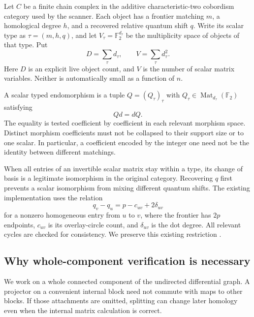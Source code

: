 \documentclass[11pt,a4paper]{article}
\theoremstyle{definition}\newtheorem{definition}[theorem]{Definition}
\theoremstyle{remark}\newtheorem{remark}[theorem]{Remark}
\newcommand{\F}{\mathbb F_2}
\begin{document}
Let $C$ be a finite chain complex in the additive characteristic-two
cobordism category used by the scanner. Each object has a frontier matching
$m$, a homological degree $h$, and a recovered relative quantum shift $q$.
Write its scalar type as $\tau=(m,h,q)$, and let $V_\tau=\F^{d_\tau}$ be the
multiplicity space of objects of that type. Put
\[
 D=\sum_\tau d_\tau,\qquad V=\sum_\tau d_\tau^2.
\]
Here $D$ is an explicit live object count, and $V$ is the number of scalar
matrix variables. Neither is automatically small as a function of $n$.

A scalar typed endomorphism is a tuple
$Q=(Q_\tau)_\tau$ with $Q_\tau\in\operatorname{Mat}_{d_\tau}(\F)$ satisfying
\begin{equation}\label{eq:commute}
 Qd=dQ.
\end{equation}
The equality is tested coefficient by coefficient in each relevant morphism
space. Distinct morphism coefficients must not be collapsed to their support
size or to one scalar. In particular, a coefficient encoded by the integer
one need not be the identity between different matchings.

When all entries of an invertible scalar matrix stay within a type, its
change of basis is a legitimate isomorphism in the original category.
Recovering $q$ first prevents a scalar isomorphism from mixing different
quantum shifts. The existing implementation uses the relation
\[
 q_v-q_u=p-c_{uv}+2\delta_{uv}
\]
for a nonzero homogeneous entry from $u$ to $v$, where the frontier has
$2p$ endpoints, $c_{uv}$ is its overlay-circle count, and $\delta_{uv}$ is the
dot degree. All relevant cycles are checked for consistency. We preserve
this existing restriction \cite{repo}.

\subsection{Why whole-component verification is necessary}

We work on a whole connected component of the undirected differential graph.
A projector on a convenient internal block need not commute with maps to
other blocks. If those attachments are omitted, splitting can change later
homology even when the internal matrix calculation is correct.
\end{document}
